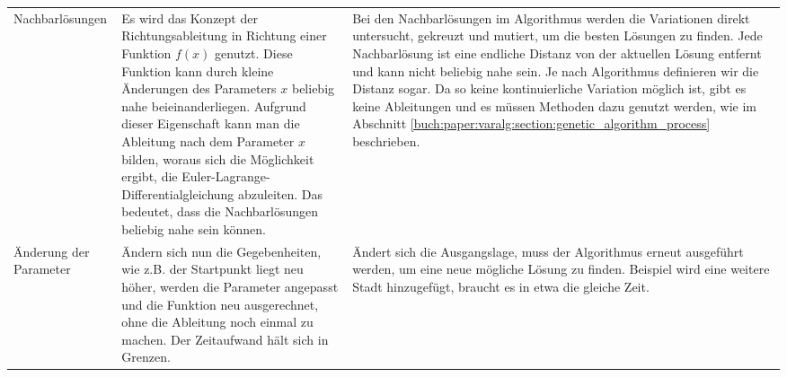 \begin{xltabular}{\textwidth}{|L|X|X|}
  \raisebox{-2pt}{\strut}
  \\ \hline
  Nachbarlösungen\raisebox{3pt}{\strut}
  & 
  Es wird das Konzept der Richtungsableitung in Richtung einer Funktion \(f(x)\)
  genutzt. Diese Funktion kann durch kleine Änderungen des Parameters \(x\) beliebig
  nahe beieinanderliegen. Aufgrund dieser Eigenschaft kann man die Ableitung nach dem
  Parameter \(x\) bilden, woraus sich die Möglichkeit ergibt, die Euler-Lagrange-Differentialgleichung
  abzuleiten. Das bedeutet, dass die Nachbarlösungen beliebig nahe sein können.  
  & 
  Bei den Nachbarlösungen im Algorithmus werden die Variationen direkt untersucht,
  gekreuzt und mutiert, um die besten Lösungen zu finden. Jede Nachbarlösung 
  ist eine endliche Distanz von der aktuellen Lösung entfernt und kann nicht beliebig 
  nahe sein. Je nach Algorithmus definieren wir die Distanz sogar.
  Da so keine kontinuierliche Variation möglich ist, gibt es keine Ableitungen
  und es müssen Methoden dazu genutzt werden, wie im Abschnitt 
  \ref{buch:paper:varalg:section:genetic_algorithm_process} beschrieben.
  \raisebox{-2pt}{\strut}
  \\ \hline
  \raisebox{3pt}{\strut}Änderung der Parameter
  & 
  Ändern sich nun die Gegebenheiten, wie z.B. der Startpunkt liegt neu höher, werden die Parameter 
  angepasst und die Funktion neu ausgerechnet, ohne die Ableitung noch einmal zu machen. Der Zeitaufwand
  hält sich in Grenzen.
  \raisebox{-2pt}{\strut}
  & 
  Ändert sich die Ausgangslage, muss der Algorithmus erneut ausgeführt werden, um eine
  neue mögliche Lösung zu finden. Beispiel wird eine weitere Stadt hinzugefügt, braucht
  es in etwa die gleiche Zeit.
  \\ \hline
\end{xltabular}
